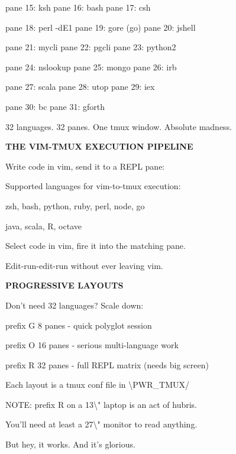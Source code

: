 \documentclass[11pt,a4paper,twoside]{book}
\begin{document}
pane 15: ksh          pane 16: bash         pane 17: csh

\begin{codebox}
pane 18: perl -dE1    pane 19: gore (go)    pane 20: jshell\\
\end{codebox}

pane 21: mycli        pane 22: pgcli        pane 23: python2

pane 24: nslookup     pane 25: mongo        pane 26: irb

pane 27: scala        pane 28: utop         pane 29: iex

pane 30: bc           pane 31: gforth

32 languages. 32 panes. One tmux window. Absolute madness.


\vspace{12pt}
{\bfseries\color{neonyellow} THE VIM-TMUX EXECUTION PIPELINE}\vspace{4pt}

Write code in vim, send it to a REPL pane:

Supported languages for vim-to-tmux execution:

zsh, bash, python, ruby, perl, node, go

java, scala, R, octave

Select code in vim, fire it into the matching pane.

Edit-run-edit-run without ever leaving vim.


\vspace{12pt}
{\bfseries\color{neonyellow} PROGRESSIVE LAYOUTS}\vspace{4pt}

Don't need 32 languages? Scale down:

prefix G  8 panes   - quick polyglot session

prefix O  16 panes  - serious multi-language work

prefix R  32 panes  - full REPL matrix (needs big screen)

\begin{codebox}
Each layout is a tmux conf file in \textbackslash{}PWR\_TMUX/\\
\end{codebox}

NOTE: prefix R on a 13\textbackslash{}" laptop is an act of hubris.

You'll need at least a 27\textbackslash{}" monitor to read anything.

But hey, it works. And it's glorious.
\end{document}
